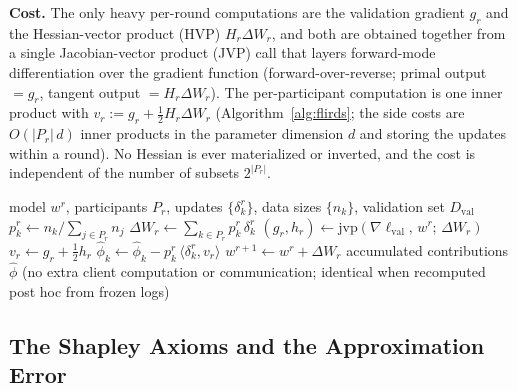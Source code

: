 \documentclass[letterpaper]{article} %
\theoremstyle{definition} %
\newcommand{\lval}{\ell_{\mathrm{val}}} %
\begin{document}
\textbf{Cost.} The only heavy per-round computations are the validation
gradient $g_r$ and the Hessian-vector product (HVP) $H_r \Delta W_r$, and both
are obtained together from a single Jacobian-vector product (JVP) call that
layers forward-mode differentiation over the gradient function
(forward-over-reverse; primal output $= g_r$, tangent output
$= H_r \Delta W_r$). The per-participant computation is one
inner product with $v_r := g_r + \tfrac12 H_r \Delta W_r$
(Algorithm~\ref{alg:flirds}; the side costs are $O(|P_r|\,d)$ inner products
in the parameter dimension $d$ and storing the updates within a round). No
Hessian is ever materialized or inverted, and the cost is independent of the
number of subsets $2^{|P_r|}$.

\begin{algorithm}[t]
\caption{Flirds (server side; one round $r$). Lines 3--6 correspond
one-to-one to the implementation's \texttt{jvp(grad(vloss), \ldots)} call and
the folding of $v_r$.}
\label{alg:flirds}
\begin{algorithmic}[1]
\REQUIRE model $w^r$, participants $P_r$, updates $\{\delta_k^r\}$, data
sizes $\{n_k\}$, validation set $D_{\mathrm{val}}$
\STATE $p_k^r \gets n_k / \sum_{j \in P_r} n_j$
\STATE $\Delta W_r \gets \sum_{k \in P_r} p_k^r\, \delta_k^r$
\STATE $(g_r, h_r) \gets \mathrm{jvp}(\nabla \lval,\, w^r;\, \Delta W_r)$
\STATE $v_r \gets g_r + \tfrac12 h_r$
\STATE $\hat\phi_k \gets \hat\phi_k - p_k^r\, \langle \delta_k^r, v_r \rangle$
\ENDFOR
\STATE $w^{r+1} \gets w^r + \Delta W_r$
\ENSURE accumulated contributions $\hat\phi$ (no extra client computation or
communication; identical when recomputed post hoc from frozen logs)
\end{algorithmic}
\end{algorithm}

\subsection{The Shapley Axioms and the Approximation Error}
\label{sec:theory}
\end{document}
